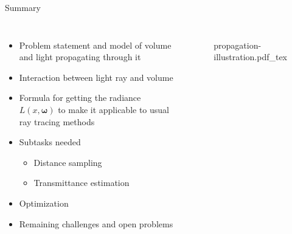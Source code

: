 \documentclass[
  english,            %
  aspectratio=169,    %
]{tumbeamer}
\newcommand\bomega[0]{\bm{\omega}}
\begin{document}
\begin{frame}{Summary}
\begin{columns}[t, onlytextwidth]
    \begin{itemize}
        \item Problem statement and model of volume and light propagating
            through it
        \item Interaction between light ray and volume
        \item Formula for getting the radiance $L(x, \bomega)$ to make it
            applicable to usual ray tracing methods
        \item Subtasks needed
            \begin{itemize}
                \item Distance sampling
                \item Transmittance estimation
            \end{itemize}
        \item Optimization
        \item Remaining challenges and open problems
    \end{itemize}
    \begin{figure}[ht]
      \centering
      \def\svgwidth{\columnwidth}
      {propagation-illustration.pdf_tex}
    \end{figure}
\end{columns}
\end{frame}

\maketitle
\end{document}
